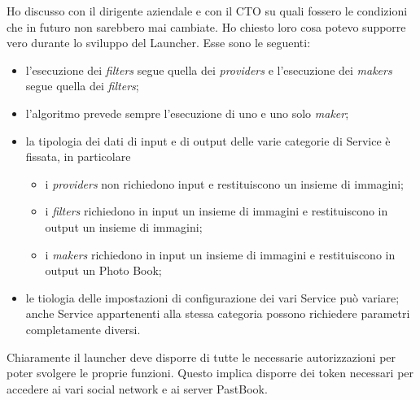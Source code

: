 				Ho discusso con il dirigente aziendale e con il CTO su quali fossero le condizioni che in futuro non sarebbero mai
				cambiate. Ho chiesto loro cosa potevo supporre vero durante lo sviluppo del Launcher. Esse sono le seguenti:
				\begin{itemize}
					\item l'esecuzione dei \emph{filters} segue quella dei \emph{providers} e l'esecuzione dei \emph{makers}
					segue quella dei \emph{filters};
					\item l'algoritmo prevede sempre l'esecuzione di uno e uno solo \emph{maker};
					\item la tipologia dei dati di input e di output delle varie categorie di Service è fissata, in particolare
					\begin{itemize}
						\item i \emph{providers} non richiedono input e restituiscono un insieme di immagini;
						\item i \emph{filters} richiedono in input un insieme di immagini e restituiscono in output un
						insieme di immagini;
						\item i \emph{makers} richiedono in input un insieme di immagini e restituiscono in output un Photo
						Book;
					\end{itemize}
					\item le tiologia delle impostazioni di configurazione dei vari Service può variare; anche Service
					appartenenti alla stessa categoria possono richiedere parametri completamente diversi.
				\end{itemize}
				Chiaramente il launcher deve disporre di tutte le necessarie autorizzazioni per poter svolgere le proprie funzioni.
				Questo implica disporre dei token necessari per accedere ai vari social network e ai server PastBook.
